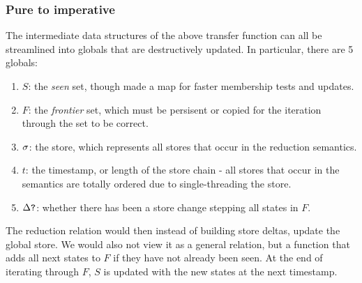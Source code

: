 \documentclass[preprint,onecolumn,9pt]{sigplanconf} %
\begin{document}
\subsubsection{Pure to imperative}

The intermediate data structures of the above transfer function can all be streamlined into globals that are destructively updated. In particular, there are 5 globals:

\begin{enumerate}
\item{$S$: the \emph{seen} set, though made a map for faster membership tests and updates.}
\item{$F$: the \emph{frontier} set, which must be persisent or copied for the iteration through the set to be correct.}
\item{$\sigma$: the store, which represents all stores that occur in the reduction semantics.}
\item{$t$: the timestamp, or length of the store chain - all stores that occur in the semantics are totally ordered due to single-threading the store.}
\item{$\Delta\mbox{{\tt ?}}$: whether there has been a store change stepping all states in $F$.}
\end{enumerate}

The reduction relation would then instead of building store deltas,
update the global store. We would also not view it as a general
relation, but a function that adds all next states to $F$ if they have
not already been seen. At the end of iterating through $F$, $S$ is
updated with the new states at the next timestamp.


\end{document}
